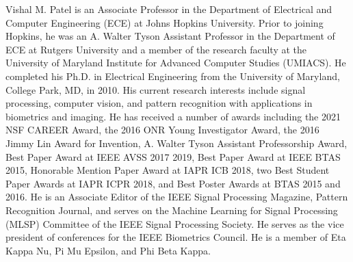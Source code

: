 \documentclass[journal]{IEEEtran}
\begin{document}
\begin{IEEEbiography}
{Vishal M. Patel}
\text{[SM'15]} is an Associate Professor in the Department of Electrical and Computer Engineering (ECE) at Johns Hopkins University. Prior to joining Hopkins, he was an A. Walter Tyson Assistant Professor in the Department of ECE at Rutgers University and a member of the research faculty at the University of Maryland Institute for Advanced Computer Studies (UMIACS). He completed his Ph.D. in Electrical Engineering from the University of Maryland, College Park, MD, in 2010.  His  current  research interests include signal processing, computer vision, and  pattern  recognition  with  applications  in  biometrics  and  imaging.    He has received a number of awards including the 2021 NSF CAREER Award, the 2016 ONR Young Investigator Award, the 2016 Jimmy Lin Award for Invention, A. Walter Tyson Assistant Professorship Award, Best Paper Award at IEEE AVSS 2017  2019, Best Paper Award at IEEE BTAS 2015, Honorable Mention Paper Award at IAPR ICB 2018, two Best Student Paper Awards at IAPR ICPR 2018, and Best Poster Awards at BTAS 2015 and 2016. He is an Associate Editor of the IEEE Signal Processing Magazine, Pattern Recognition Journal, and serves on the Machine Learning for Signal Processing (MLSP) Committee of the IEEE Signal Processing Society. He serves as the vice president of conferences for the IEEE Biometrics Council. He is a member of Eta Kappa Nu, Pi Mu Epsilon, and Phi Beta Kappa.
\end{IEEEbiography}
\end{document}
